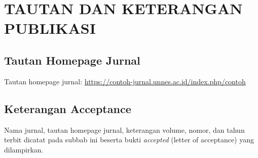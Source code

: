 \chapter{TAUTAN DAN KETERANGAN PUBLIKASI}
\section{Tautan Homepage Jurnal}
Tautan homepage jurnal: \url{https://contoh-jurnal.unnes.ac.id/index.php/contoh}

\section{Keterangan Acceptance}
Nama jurnal, tautan homepage jurnal, keterangan volume, nomor, dan tahun terbit dicatat pada
subbab ini beserta bukti \textit{accepted} (letter of acceptance) yang dilampirkan.
